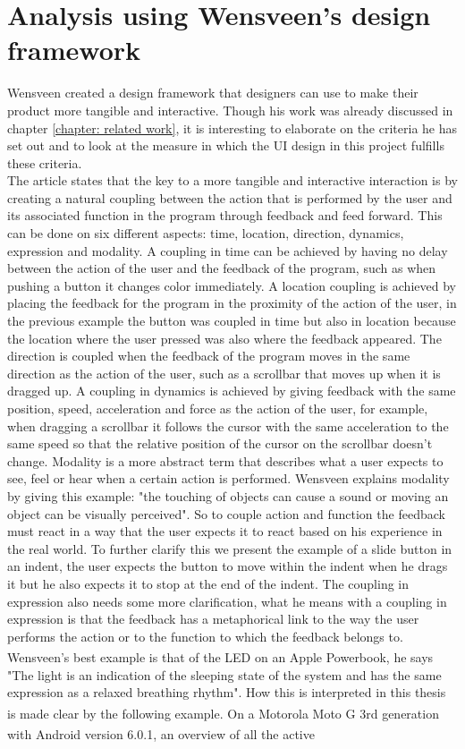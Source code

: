 \section{Analysis using Wensveen's design framework \cite{Wensveen2004}}

Wensveen \cite{Wensveen2004} created a design framework that designers can use to make their product more tangible and interactive. Though his work was already discussed in chapter \ref{chapter: related work}, it is interesting to elaborate on the criteria he has set out and to look at the measure in which the UI design in this project fulfills these criteria.\\
The article states that the key to a more tangible and interactive interaction is by creating a natural coupling between the action that is performed by the user and its associated function in the program through feedback and feed forward. This can be done on six different aspects: time, location, direction, dynamics, expression and modality. A coupling in time can be achieved by having no delay between the action of the user and the feedback of the program, such as when pushing a button it changes color immediately. A location coupling is achieved by placing the feedback for the program in the proximity of the action of the user, in the previous example the button was coupled in time but also in location because the location where the user pressed was also where the feedback appeared. The direction is coupled when\textsc{} the feedback of the program moves in the same direction as the action of the user, such as a scrollbar that moves up when it is dragged up. A coupling in dynamics is achieved by giving feedback with the same position, speed, acceleration and force as the action of the user, for example, when dragging a scrollbar it follows the cursor with the same acceleration to the same speed so that the relative position of the cursor on the scrollbar doesn't change. Modality is a more abstract term that describes what a user expects to see, feel or hear when a certain action is performed. Wensveen explains modality by giving this example: "the touching of objects can cause a sound or moving an object can be visually perceived". So to couple action and function the feedback must react in a way that the user expects it to react based on his experience in the real world. To further clarify this we present the example of a slide button in an indent, the user expects the button to move within the indent when he drags it but he also expects it to stop at the end of the indent. The coupling in expression also needs some more clarification, what he means with a coupling in expression is that the feedback has a metaphorical link to the way the user performs the action or to the function to which the feedback belongs to. Wensveen's best example is that of the LED on an Apple Powerbook\textsuperscript{\textregistered}, he says "The light is an indication of the sleeping state of the system and has the same expression as a relaxed breathing rhythm". How this is interpreted in this thesis is made clear by the following example. On a Motorola Moto G\textsuperscript{\textregistered} 3rd generation with Android\textsuperscript{\textregistered} version 6.0.1, an overview of all the active 